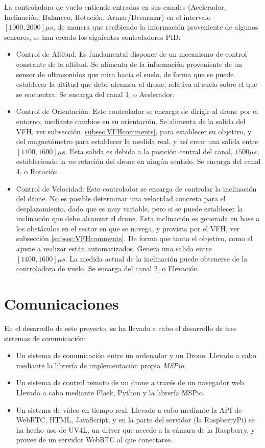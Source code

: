 La controladora de vuelo entiende entradas en sus canales (Acelerador, Inclinación, Balanceo, Rotación, Armar/Desarmar) en el intervalo $[1000, 2000]\mu s$, de manera que recibiendo la información proveniente de algunos sensores, se han creado los siguientes controladores PID: 

\begin{itemize}
\item Control de Altitud: Es fundamental disponer de un mecanismo de control constante de la altitud. Se alimenta de la información proveniente de un sensor de ultrasonidos que mira hacia el suelo, de forma que se puede establecer la altitud que debe alcanzar el drone, relativa al suelo sobre el que se encuentra. Se encarga del canal 1, o Acelerador.
\item Control de Orientación: Este controlador se encarga de dirigir al drone por el entorno, mediante cambios en su orientación. Se alimenta de la salida del VFH, ver subsección \ref{subsec:VFHcomments}, para establecer su objetivo, y del magnetómetro para establecer la medida real, y así crear una salida entre $[1400, 1600]\mu s$.
Esta salida es debida a la posición central del canal, $1500\mu s$, estableciendo la \emph{no} rotación del drone en ningún sentido. Se encarga del canal 4, o Rotación.
\item Control de Velocidad: Este controlador se encarga de controlar la inclinación del drone. No es posible determinar una velocidad concreta para el desplazamiento, dado que es muy variable, pero si se puede establecer la inclinación que debe alcanzar el drone. Esta inclinación es generada en base a los obstáculos en el sector en que se navega, y provista por el VFH, ver subsección \ref{subsec:VFHcomments}. De forma que tanto el objetivo, como el ajuste a realizar están automatizados. Genera una salida entre $[1400, 1600]\mu s$. La medida actual de la inclinación puede obtenerse de la controladora de vuelo. Se encarga del canal 2, o Elevación.
\end{itemize}


\section{Comunicaciones}

En el desarrollo de este proyecto, se ha llevado a cabo el desarrollo de tres sistemas de comunicación: 

\begin{itemize}
\item Un sistema de comunicación entre un ordenador y un Drone. Llevado a cabo mediante la librería de implementación propia \emph{MSPio}.
\item Un sistema de control remoto de un drone a través de un navegador web. Llevado a cabo mediante Flask, Python y la librería MSPio.
\item Un sistema de vídeo en tiempo real. Llevado a cabo mediante la API de WebRTC, HTML, JavaScript, y en la parte del servidor (la RaspberryPi) se ha hecho uso de UV4L, un driver que accede a la cámara de la Raspberry, y provee de un servidor WebRTC al que conectarse.
\end{itemize}


